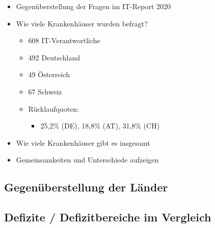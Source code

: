 \begin{itemize}
	\item Gegenüberstellung der Fragen im IT-Report 2020 \parencite{huebner2020}
	\item Wie viele Krankenhäuser wurden befragt?
	\begin{itemize}
		\item 608 IT-Verantwortliche
		\item 492 Deutschland
		\item 49 Österreich
		\item 67 Schweiz
		\item Rücklaufquoten:
		\begin{itemize}
			\item 25,2\% (DE), 18,8\% (AT), 31,8\% (CH)
		\end{itemize}
	\end{itemize}
	\item Wie viele Krankenhäuser gibt es insgesamt
	\item Gemeinsamkeiten und Unterschiede aufzeigen
\end{itemize}
\subsection{Gegenüberstellung der Länder}
\subsection{Defizite / Defizitbereiche im Vergleich}
